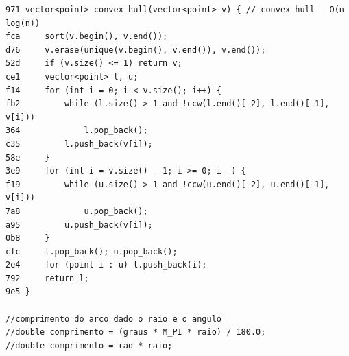 \documentclass[11pt, a4paper, twoside]{article}
\begin{document}
\begin{lstlisting}
971 vector<point> convex_hull(vector<point> v) { // convex hull - O(n log(n))
fca 	sort(v.begin(), v.end());
d76 	v.erase(unique(v.begin(), v.end()), v.end());
52d 	if (v.size() <= 1) return v;
ce1 	vector<point> l, u;
f14 	for (int i = 0; i < v.size(); i++) {
fb2 		while (l.size() > 1 and !ccw(l.end()[-2], l.end()[-1], v[i]))
364 			l.pop_back();
c35 		l.push_back(v[i]);
58e 	}
3e9 	for (int i = v.size() - 1; i >= 0; i--) {
f19 		while (u.size() > 1 and !ccw(u.end()[-2], u.end()[-1], v[i]))
7a8 			u.pop_back();
a95 		u.push_back(v[i]);
0b8 	}
cfc 	l.pop_back(); u.pop_back();
2e4 	for (point i : u) l.push_back(i);
792 	return l;
9e5 }

//comprimento do arco dado o raio e o angulo
//double comprimento = (graus * M_PI * raio) / 180.0;
//double comprimento = rad * raio;
\end{lstlisting}
\end{document}

